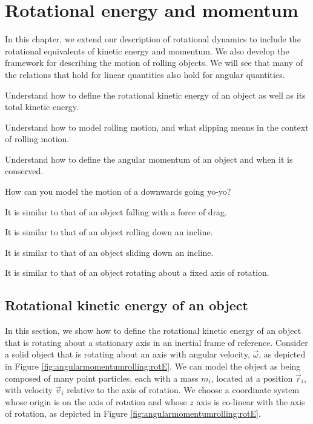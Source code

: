 \chapter{Rotational energy and momentum}
\label{chapter:angularmomentumrolling}
In this chapter, we extend our description of rotational dynamics to include the rotational equivalents of kinetic energy and momentum. We also develop the framework for describing the motion of rolling objects. We will see that many of the relations that hold for linear quantities also hold for angular quantities. 

\begin{learningObjectives}{
 \item Understand how to define the rotational kinetic energy of an object as well as its total kinetic energy.
 \item Understand how to model rolling motion, and what slipping means in the context of rolling motion.
 \item Understand how to define the angular momentum of an object and when it is conserved.
 }
\end{learningObjectives}

\begin{opening}
\begin{MCquestion}{How can you model the motion of a downwards going yo-yo?}
\item It is similar to that of an object falling with a force of drag.
\item It is similar to that of an object rolling down an incline. \correct
\item It is similar to that of an object sliding down an incline.
\item It is similar to that of an object rotating about a fixed axis of rotation.
\end{MCquestion}
\end{opening}

\section{Rotational kinetic energy of an object}
In this section, we show how to define the rotational kinetic energy of an object that is rotating about a stationary axis in an inertial frame of reference. Consider a solid object that is rotating about an axis with angular velocity, $\vec\omega$, as depicted in Figure \ref{fig:angularmomentumrolling:rotE}.
We can model the object as being composed of many point particles, each with a mass $m_i$, located at a position $\vec r_i$, with velocity $\vec v_i$ relative to the axis of rotation. We choose a coordinate system whose origin is on the axis of rotation and whose $z$ axis is co-linear with the axis of rotation, as depicted in Figure \ref{fig:angularmomentumrolling:rotE}.

